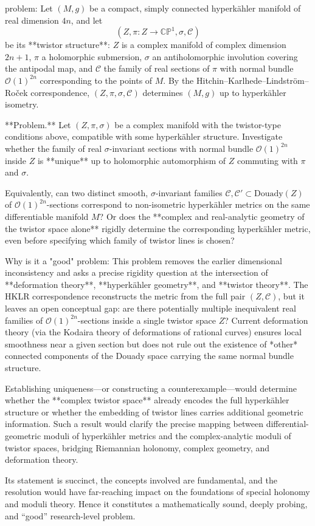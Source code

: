problem:  
Let \( (M, g) \) be a compact, simply connected hyperkähler manifold of real dimension \(4n\), and let  
\[
(Z, \pi: Z \to \mathbb{CP}^1, \sigma, \mathcal{C})
\]
be its **twistor structure**: \(Z\) is a complex manifold of complex dimension \(2n+1\), \(\pi\) a holomorphic submersion, \(\sigma\) an antiholomorphic involution covering the antipodal map, and \(\mathcal{C}\) the family of real sections of \(\pi\) with normal bundle \( \mathcal{O}(1)^{2n} \) corresponding to the points of \(M\).  
By the Hitchin–Karlhede–Lindström–Roček correspondence, \( (Z, \pi, \sigma, \mathcal{C}) \) determines \( (M, g) \) up to hyperkähler isometry.

**Problem.**  
Let \( (Z, \pi, \sigma) \) be a complex manifold with the twistor-type conditions above, compatible with some hyperkähler structure. Investigate whether the family of real \(\sigma\)-invariant sections with normal bundle \( \mathcal{O}(1)^{2n} \) inside \(Z\) is **unique** up to holomorphic automorphism of \(Z\) commuting with \(\pi\) and \(\sigma\).  

Equivalently, can two distinct smooth, \(\sigma\)-invariant families \(\mathcal{C}, \mathcal{C}' \subset \mathrm{Douady}(Z)\) of \( \mathcal{O}(1)^{2n} \)-sections correspond to non-isometric hyperkähler metrics on the same differentiable manifold \(M\)?  
Or does the **complex and real-analytic geometry of the twistor space alone** rigidly determine the corresponding hyperkähler metric, even before specifying which family of twistor lines is chosen?  

Why is it a "good" problem:  
This problem removes the earlier dimensional inconsistency and asks a precise rigidity question at the intersection of **deformation theory**, **hyperkähler geometry**, and **twistor theory**. The HKLR correspondence reconstructs the metric from the full pair \((Z, \mathcal{C})\), but it leaves an open conceptual gap: are there potentially multiple inequivalent real families of \( \mathcal{O}(1)^{2n} \)-sections inside a single twistor space \(Z\)? Current deformation theory (via the Kodaira theory of deformations of rational curves) ensures local smoothness near a given section but does not rule out the existence of *other* connected components of the Douady space carrying the same normal bundle structure.  

Establishing uniqueness—or constructing a counterexample—would determine whether the **complex twistor space** already encodes the full hyperkähler structure or whether the embedding of twistor lines carries additional geometric information. Such a result would clarify the precise mapping between differential-geometric moduli of hyperkähler metrics and the complex-analytic moduli of twistor spaces, bridging Riemannian holonomy, complex geometry, and deformation theory.  

Its statement is succinct, the concepts involved are fundamental, and the resolution would have far-reaching impact on the foundations of special holonomy and moduli theory. Hence it constitutes a mathematically sound, deeply probing, and “good” research-level problem.